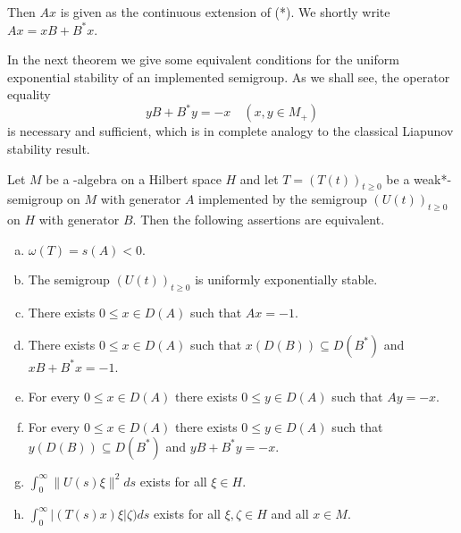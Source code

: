 \newpage


Then $Ax$ is given as the continuous extension of (*).
We shortly write $Ax = xB + B^*x$.

In the next theorem we give some equivalent conditions for the uniform exponential stability of an implemented semigroup.
As we shall see, the operator equality
\[
yB + B^*y = -x \quad (x,y \in M_{+})
\]
is necessary and sufficient, which is in complete analogy to the classical Liapunov stability result.

\begin{theorem}\label{thm:d4-2.2}
Let $M$ be a \WA-algebra on a Hilbert space $H$ and let $T = (T(t))_{t \geq 0}$ be a weak*-semigroup on $M$ with generator $A$ implemented by the semigroup $(U(t))_{t \geq 0}$ on $H$ with generator $B$.
Then the following assertions are equivalent.

\begin{enumerate}[(a)]
\item
$\omega(T) = s(A) < 0$.

\item
The semigroup $(U(t))_{t \geq 0}$ is uniformly exponentially stable.

\item
There exists $0 \leq x \in D(A)$ such that $Ax = -1$.

\item
There exists $0 \leq x \in D(A)$ such that $x(D(B)) \subseteq D(B^*)$ and $xB+B^*x = -1$.

\item
For every $0 \leq x \in D(A)$ there exists $0 \leq y \in D(A)$ such that $Ay = -x$.

\item
For every $0 \leq x \in D(A)$ there exists $0 \leq y \in D(A)$ such that $y(D(B)) \subseteq D(B^*)$ and $yB+B^*y = -x$.

\item
$\int_{0}^{\infty} \|U(s)\xi\|^2ds$ exists for all $\xi \in H$.

\item
$\int_{0}^{\infty} |(T(s)x)\xi|\zeta)ds$ exists for all $\xi,\zeta \in H$ and all $x \in M$.
\end{enumerate}
\end{theorem}

